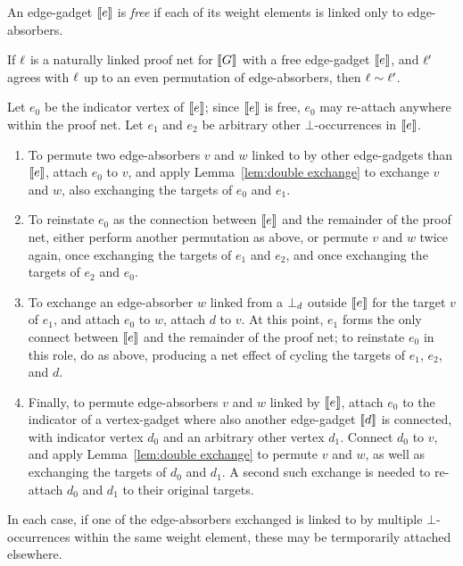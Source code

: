 \documentclass[conference]{IEEEtran}
\begin{document}
An edge-gadget $\llbracket e\rrbracket$ is \emph{free} if each of its weight elements is linked only to edge-absorbers.


\begin{lemma}
\label{lem:permute edge-absorbers}
If $\ell$ is a naturally linked proof net for $\llbracket G\rrbracket$ with a free edge-gadget $\llbracket e\rrbracket$, and $\ell'$ agrees with $\ell$ up to an even permutation of edge-absorbers, then $\ell\sim\ell'$.
\end{lemma}

\begin{IEEEproof}
Let $e_0$ be the indicator vertex of $\llbracket e\rrbracket$; since $\llbracket e\rrbracket$ is free, $e_0$ may re-attach anywhere within the proof net.
%
Let $e_1$ and $e_2$ be arbitrary other $\bot$-occurrences in $\llbracket e\rrbracket$.

\begin{enumerate}

	\item
To permute two edge-absorbers $v$ and $w$ linked to by other edge-gadgets than $\llbracket e\rrbracket$, attach $e_0$ to $v$, and apply Lemma~\ref{lem:double exchange} to exchange $v$ and $w$, also exchanging the targets of $e_0$ and $e_1$.

	\item
To reinstate $e_0$ as the connection between $\llbracket e\rrbracket$ and the remainder of the proof net, either perform another permutation as above, or permute $v$ and $w$ twice again, once exchanging the targets of $e_1$ and $e_2$, and once exchanging the targets of $e_2$ and $e_0$.

	\item
To exchange an edge-absorber $w$ linked from a $\bot_{d}$ outside $\llbracket e\rrbracket$ for the target $v$ of $e_1$, and attach $e_0$ to $w$, attach $d$ to $v$.
%
At this point, $e_1$ forms the only connect between $\llbracket e\rrbracket$ and the remainder of the proof net; to reinstate $e_0$ in this role, do as above, producing a net effect of cycling the targets of $e_1$, $e_2$, and $d$.

	\item
Finally, to permute edge-absorbers $v$ and $w$ linked by $\llbracket e\rrbracket$, attach $e_0$ to the indicator of a vertex-gadget where also another edge-gadget $\llbracket d\rrbracket$ is connected, with indicator vertex $d_0$ and an arbitrary other vertex $d_1$.
%
Connect $d_0$ to $v$, and apply Lemma~\ref{lem:double exchange} to permute $v$ and $w$, as well as exchanging the targets of $d_0$ and $d_1$.
%
A second such exchange is needed to re-attach $d_0$ and $d_1$ to their original targets.

\end{enumerate}

In each case, if one of the edge-absorbers exchanged is linked to by multiple $\bot$-occurrences within the same weight element, these may be termporarily attached elsewhere.

\end{IEEEproof}
\end{document}
